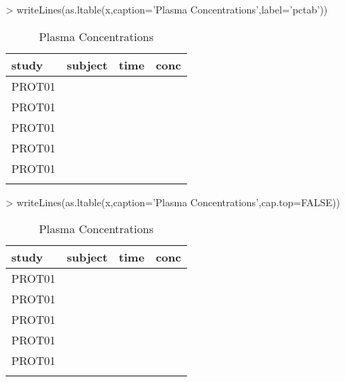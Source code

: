 \documentclass[titlepage]{article}
\begin{document}
\begin{Schunk}
\begin{Sinput}
> writeLines(as.ltable(x,caption='Plasma Concentrations',label='pctab'))
\end{Sinput}
\begin{table}[H]
 \caption[Plasma Concentrations]{Plasma Concentrations \label{pctab}}
 \begin{center}
  \begin{tabular}{lrrr}
    \hline \hline
   study & subject & time & conc \\ \hline
   PROT01 & \verb#1001# & \verb#0# & \verb#0.12# \\
   PROT01 & \verb#1001# & \verb#1# & \verb#34.00# \\
   PROT01 & \verb#1001# & \verb#2# & \verb#5.60# \\
   PROT01 & \verb#1002# & \verb#0# & \verb#0.50# \\
   PROT01 & \verb#1002# & \verb#1# & \verb#200.00# \\
    & \verb#1002# & \verb#2# & \verb## \\ \hline
  \end{tabular}
 \end{center}
\end{table}\end{Schunk}
\begin{Schunk}
\begin{Sinput}
> writeLines(as.ltable(x,caption='Plasma Concentrations',cap.top=FALSE))
\end{Sinput}
\begin{table}[H]
 \begin{center}
  \begin{tabular}{lrrr}
    \hline \hline
   study & subject & time & conc \\ \hline
   PROT01 & \verb#1001# & \verb#0# & \verb#0.12# \\
   PROT01 & \verb#1001# & \verb#1# & \verb#34.00# \\
   PROT01 & \verb#1001# & \verb#2# & \verb#5.60# \\
   PROT01 & \verb#1002# & \verb#0# & \verb#0.50# \\
   PROT01 & \verb#1002# & \verb#1# & \verb#200.00# \\
    & \verb#1002# & \verb#2# & \verb## \\ \hline
  \end{tabular}
 \end{center}
 \caption[Plasma Concentrations]{Plasma Concentrations }
\end{table}\end{Schunk}
\end{document}
